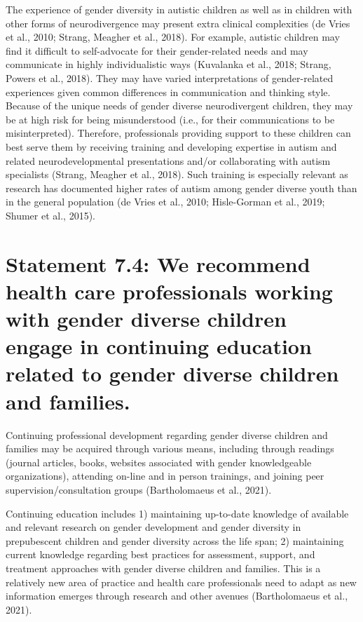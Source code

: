 \documentclass[
]{book}
\begin{document}
The experience of gender diversity in autistic
children as well as in children with other forms
of neurodivergence may present extra clinical
complexities (de Vries et al., 2010; Strang,
Meagher et al., 2018). For example, autistic children may find it difficult to self-advocate for
their gender-related needs and may communicate
in highly individualistic ways (Kuvalanka et al.,
2018; Strang, Powers et al., 2018). They may have
varied interpretations of gender-related experiences given common differences in communication and thinking style. Because of the unique
needs of gender diverse neurodivergent children,
they may be at high risk for being misunderstood
(i.e., for their communications to be misinterpreted). Therefore, professionals providing support to these children can best serve them by
receiving training and developing expertise in
autism and related neurodevelopmental presentations and/or collaborating with autism specialists (Strang, Meagher et al., 2018). Such training
is especially relevant as research has documented
higher rates of autism among gender diverse
youth than in the general population (de Vries
et al., 2010; Hisle-Gorman et al., 2019; Shumer
et al., 2015).

\hypertarget{statement-7.4-we-recommend-health-care-professionals-working-with-gender-diverse-children-engage-in-continuing-education-related-to-gender-diverse-children-and-families.}{%
\section*{Statement 7.4: We recommend health care professionals working with gender diverse children engage in continuing education related to gender diverse children and families.}\label{statement-7.4-we-recommend-health-care-professionals-working-with-gender-diverse-children-engage-in-continuing-education-related-to-gender-diverse-children-and-families.}}

Continuing professional development regarding
gender diverse children and families may be
acquired through various means, including
through readings (journal articles, books, websites
associated with gender knowledgeable organizations), attending on-line and in person trainings,
and joining peer supervision/consultation groups
(Bartholomaeus et al., 2021).

Continuing education includes 1) maintaining
up-to-date knowledge of available and relevant
research on gender development and gender
diversity in prepubescent children and gender
diversity across the life span; 2) maintaining current knowledge regarding best practices for
assessment, support, and treatment approaches
with gender diverse children and families. This
is a relatively new area of practice and health
care professionals need to adapt as new information emerges through research and other avenues
(Bartholomaeus et al., 2021).
\end{document}
